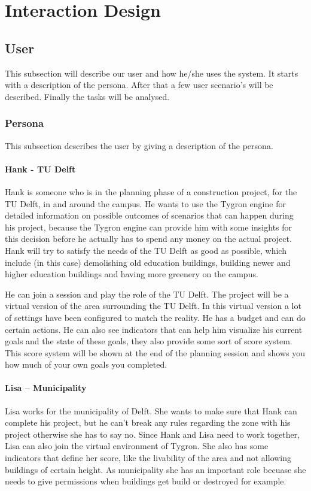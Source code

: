 \chapter{Interaction Design}\label{ch:IxD}
\section{User}
This subsection will describe our user and how he/she uses the system. 
It starts with a description of the persona. 
After that a few user scenario's will be described.
Finally the tasks will be analysed.

\subsection{Persona}
This subsection describes the user by giving a description of the persona.
\subsubsection*{Hank - TU Delft}
Hank is someone who is in the planning phase of a construction project, for the TU Delft, in and around the campus. He wants to use the Tygron engine for detailed information on possible outcomes of scenarios that can happen during his project, because the Tygron engine can provide him with some insights for this decision before he actually has to spend any money on the actual project. Hank will try to satisfy the needs of the TU Delft as good as possible, which include (in this case) demolishing old education buildings, building newer and higher education buildings and having more greenery on the campus.

He can join a session and play the role of the TU Delft. The project will be a virtual version of the area surrounding the TU Delft. In this virtual version a lot of settings have been configured to match the reality. He has a budget and can do certain actions. He can also see indicators that can help him visualize his current goals and the state of these goals, they also provide some sort of score system. This score system will be shown at the end of the planning session and shows you how much of your own goals you completed. 

\subsubsection*{Lisa – Municipality}
Lisa works for the municipality of Delft. She wants to make sure that Hank can complete his project, but he can’t break any rules regarding the zone with his project otherwise she has to say no. Since Hank and Lisa need to work together, Lisa can also join the virtual environment of Tygron. She also has some indicators that define her score, like the livability of the area and not allowing buildings of certain height. As municipality she has an important role becuase she needs to give permissions when buildings get build or destroyed for example.

